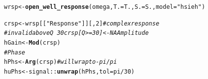 \documentclass[10pt]{article}\usepackage[]{graphicx}\usepackage[]{color}
\makeatletter
\newcommand{\hlnum}[1]{\textcolor[rgb]{0.686,0.059,0.569}{#1}}%
\newcommand{\hlstr}[1]{\textcolor[rgb]{0.192,0.494,0.8}{#1}}%
\newcommand{\hlcom}[1]{\textcolor[rgb]{0.678,0.584,0.686}{\textit{#1}}}%
\newcommand{\hlopt}[1]{\textcolor[rgb]{0,0,0}{#1}}%
\newcommand{\hlstd}[1]{\textcolor[rgb]{0.345,0.345,0.345}{#1}}%
\newcommand{\hlkwb}[1]{\textcolor[rgb]{0.69,0.353,0.396}{#1}}%
\newcommand{\hlkwc}[1]{\textcolor[rgb]{0.333,0.667,0.333}{#1}}%
\newcommand{\hlkwd}[1]{\textcolor[rgb]{0.737,0.353,0.396}{\textbf{#1}}}%
\newenvironment{kframe}{%
 \def\at@end@of@kframe{}%
 \ifinner\ifhmode%
  \def\at@end@of@kframe{\end{minipage}}%
  \begin{minipage}{\columnwidth}%
 \fi\fi%
 \def\FrameCommand##1{\hskip\@totalleftmargin \hskip-\fboxsep
 \colorbox{shadecolor}{##1}\hskip-\fboxsep
     \hskip-\linewidth \hskip-\@totalleftmargin \hskip\columnwidth}%
 \MakeFramed {\advance\hsize-\width
   \@totalleftmargin\z@ \linewidth\hsize
   \@setminipage}}%
 {\par\unskip\endMakeFramed%
 \at@end@of@kframe}
\newenvironment{knitrout}{}{} %
\makeatother
\begin{document}
\begin{knitrout}
\color{fgcolor}\begin{kframe}
\begin{alltt}
\hlstd{wrsp} \hlkwb{<-} \hlkwd{open_well_response}\hlstd{(omega,} \hlkwc{T.} \hlstd{= T.,} \hlkwc{S.} \hlstd{= S.,} \hlkwc{model} \hlstd{=} \hlstr{"hsieh"}\hlstd{)}
\end{alltt}


{\ttfamily\noindent\color{warningcolor}{\#\# Warning: water column height 'Hw' not given. using default\\\#\# Warning: aquifer thickness 'Ta' not given. using default\\\#\# Warning: this model has not yet been verified.}}\begin{alltt}
\hlstd{crsp} \hlkwb{<-} \hlstd{wrsp[[}\hlstr{"Response"}\hlstd{]][,} \hlnum{2}\hlstd{]}  \hlcom{# complex response}
\hlcom{# invalid above Q ~ 30 crsp[Q>=30] <- NA Amplitude}
\hlstd{hGain} \hlkwb{<-} \hlkwd{Mod}\hlstd{(crsp)}
\hlcom{# Phase}
\hlstd{hPhs} \hlkwb{<-} \hlkwd{Arg}\hlstd{(crsp)}  \hlcom{# will wrap to -pi/pi}
\hlstd{huPhs} \hlkwb{<-} \hlstd{signal::}\hlkwd{unwrap}\hlstd{(hPhs,} \hlkwc{tol} \hlstd{= pi}\hlopt{/}\hlnum{30}\hlstd{)}
\end{alltt}
\end{kframe}
\end{knitrout}
\end{document}
